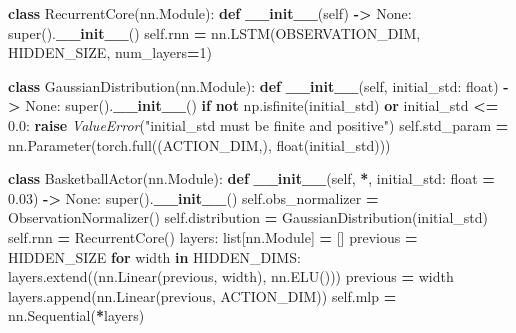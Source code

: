 \documentclass[
  american,
  11pt,
  letterpaper,
]{article}
\newenvironment{Shaded}{\begin{snugshade}}{\end{snugshade}}
\newcommand{\BuiltInTok}[1]{#1}
\newcommand{\ControlFlowTok}[1]{\textcolor[rgb]{0.13,0.29,0.53}{\textbf{#1}}}
\newcommand{\DecValTok}[1]{\textcolor[rgb]{0.00,0.00,0.81}{#1}}
\newcommand{\FloatTok}[1]{\textcolor[rgb]{0.00,0.00,0.81}{#1}}
\newcommand{\FunctionTok}[1]{\textcolor[rgb]{0.13,0.29,0.53}{\textbf{#1}}}
\newcommand{\KeywordTok}[1]{\textcolor[rgb]{0.13,0.29,0.53}{\textbf{#1}}}
\newcommand{\NormalTok}[1]{#1}
\newcommand{\OperatorTok}[1]{\textcolor[rgb]{0.81,0.36,0.00}{\textbf{#1}}}
\newcommand{\PreprocessorTok}[1]{\textcolor[rgb]{0.56,0.35,0.01}{\textit{#1}}}
\newcommand{\StringTok}[1]{\textcolor[rgb]{0.31,0.60,0.02}{#1}}
\newcommand{\VariableTok}[1]{\textcolor[rgb]{0.00,0.00,0.00}{#1}}
\renewenvironment{Shaded}{\par\smallskip}{\par\smallskip}
\begin{document}
\begin{Shaded}
\begin{Highlighting}[]
\KeywordTok{class}\NormalTok{ RecurrentCore(nn.Module):}
    \KeywordTok{def} \FunctionTok{\_\_init\_\_}\NormalTok{(}\VariableTok{self}\NormalTok{) }\OperatorTok{{-}\textgreater{}} \VariableTok{None}\NormalTok{:}
        \BuiltInTok{super}\NormalTok{().}\FunctionTok{\_\_init\_\_}\NormalTok{()}
        \VariableTok{self}\NormalTok{.rnn }\OperatorTok{=}\NormalTok{ nn.LSTM(OBSERVATION\_DIM, HIDDEN\_SIZE, num\_layers}\OperatorTok{=}\DecValTok{1}\NormalTok{)}


\KeywordTok{class}\NormalTok{ GaussianDistribution(nn.Module):}
    \KeywordTok{def} \FunctionTok{\_\_init\_\_}\NormalTok{(}\VariableTok{self}\NormalTok{, initial\_std: }\BuiltInTok{float}\NormalTok{) }\OperatorTok{{-}\textgreater{}} \VariableTok{None}\NormalTok{:}
        \BuiltInTok{super}\NormalTok{().}\FunctionTok{\_\_init\_\_}\NormalTok{()}
        \ControlFlowTok{if} \KeywordTok{not}\NormalTok{ np.isfinite(initial\_std) }\KeywordTok{or}\NormalTok{ initial\_std }\OperatorTok{\textless{}=} \FloatTok{0.0}\NormalTok{:}
            \ControlFlowTok{raise} \PreprocessorTok{ValueError}\NormalTok{(}\StringTok{"initial\_std must be finite and positive"}\NormalTok{)}
        \VariableTok{self}\NormalTok{.std\_param }\OperatorTok{=}\NormalTok{ nn.Parameter(torch.full((ACTION\_DIM,), }\BuiltInTok{float}\NormalTok{(initial\_std)))}


\KeywordTok{class}\NormalTok{ BasketballActor(nn.Module):}
    \KeywordTok{def} \FunctionTok{\_\_init\_\_}\NormalTok{(}\VariableTok{self}\NormalTok{, }\OperatorTok{*}\NormalTok{, initial\_std: }\BuiltInTok{float} \OperatorTok{=} \FloatTok{0.03}\NormalTok{) }\OperatorTok{{-}\textgreater{}} \VariableTok{None}\NormalTok{:}
        \BuiltInTok{super}\NormalTok{().}\FunctionTok{\_\_init\_\_}\NormalTok{()}
        \VariableTok{self}\NormalTok{.obs\_normalizer }\OperatorTok{=}\NormalTok{ ObservationNormalizer()}
        \VariableTok{self}\NormalTok{.distribution }\OperatorTok{=}\NormalTok{ GaussianDistribution(initial\_std)}
        \VariableTok{self}\NormalTok{.rnn }\OperatorTok{=}\NormalTok{ RecurrentCore()}
\NormalTok{        layers: }\BuiltInTok{list}\NormalTok{[nn.Module] }\OperatorTok{=}\NormalTok{ []}
\NormalTok{        previous }\OperatorTok{=}\NormalTok{ HIDDEN\_SIZE}
        \ControlFlowTok{for}\NormalTok{ width }\KeywordTok{in}\NormalTok{ HIDDEN\_DIMS:}
\NormalTok{            layers.extend((nn.Linear(previous, width), nn.ELU()))}
\NormalTok{            previous }\OperatorTok{=}\NormalTok{ width}
\NormalTok{        layers.append(nn.Linear(previous, ACTION\_DIM))}
        \VariableTok{self}\NormalTok{.mlp }\OperatorTok{=}\NormalTok{ nn.Sequential(}\OperatorTok{*}\NormalTok{layers)}


\end{Highlighting}
\end{Shaded}
\end{document}
